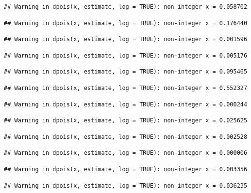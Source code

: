 \documentclass[]{article}
\begin{document}
\begin{verbatim}
## Warning in dpois(x, estimate, log = TRUE): non-integer x = 0.058702
\end{verbatim}

\begin{verbatim}
## Warning in dpois(x, estimate, log = TRUE): non-integer x = 0.176440
\end{verbatim}

\begin{verbatim}
## Warning in dpois(x, estimate, log = TRUE): non-integer x = 0.001596
\end{verbatim}

\begin{verbatim}
## Warning in dpois(x, estimate, log = TRUE): non-integer x = 0.005176
\end{verbatim}

\begin{verbatim}
## Warning in dpois(x, estimate, log = TRUE): non-integer x = 0.095465
\end{verbatim}

\begin{verbatim}
## Warning in dpois(x, estimate, log = TRUE): non-integer x = 0.552327
\end{verbatim}

\begin{verbatim}
## Warning in dpois(x, estimate, log = TRUE): non-integer x = 0.000244
\end{verbatim}

\begin{verbatim}
## Warning in dpois(x, estimate, log = TRUE): non-integer x = 0.025625
\end{verbatim}

\begin{verbatim}
## Warning in dpois(x, estimate, log = TRUE): non-integer x = 0.002528
\end{verbatim}

\begin{verbatim}
## Warning in dpois(x, estimate, log = TRUE): non-integer x = 0.000006
\end{verbatim}

\begin{verbatim}
## Warning in dpois(x, estimate, log = TRUE): non-integer x = 0.003356
\end{verbatim}

\begin{verbatim}
## Warning in dpois(x, estimate, log = TRUE): non-integer x = 0.036235
\end{verbatim}
\end{document}
